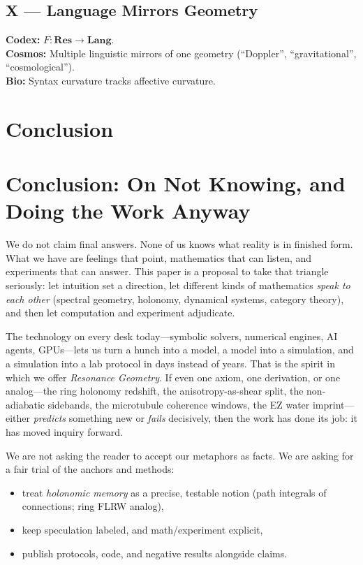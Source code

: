 \documentclass[11pt]{article}
\begin{document}
\subsection*{X --- Language Mirrors Geometry}
\textbf{Codex:} $F:\mathbf{Res}\to \mathbf{Lang}$. \\
\textbf{Cosmos:} Multiple linguistic mirrors of one geometry (``Doppler'', ``gravitational'', ``cosmological''). \\
\textbf{Bio:} Syntax curvature tracks affective curvature.

\section{Conclusion}
\section{Conclusion: On Not Knowing, and Doing the Work Anyway}

We do not claim final answers. None of us knows what reality is in finished form.
What we have are feelings that point, mathematics that can listen, and experiments that can answer.
This paper is a proposal to take that triangle seriously: let intuition set a direction,
let different kinds of mathematics \emph{speak to each other} (spectral geometry, holonomy, dynamical systems, category theory),
and then let computation and experiment adjudicate.

The technology on every desk today---symbolic solvers, numerical engines, AI agents, GPUs---lets us turn
a hunch into a model, a model into a simulation, and a simulation into a lab protocol in days instead of years.
That is the spirit in which we offer \emph{Resonance Geometry}.
If even one axiom, one derivation, or one analog---the ring holonomy redshift, the anisotropy-as-shear split,
the non-adiabatic sidebands, the microtubule coherence windows, the EZ water imprint---either
\emph{predicts} something new or \emph{fails} decisively, then the work has done its job:
it has moved inquiry forward.

We are not asking the reader to accept our metaphors as facts.
We are asking for a fair trial of the anchors and methods:
\begin{itemize}
  \item treat \emph{holonomic memory} as a precise, testable notion (path integrals of connections; ring FLRW analog),
  \item keep speculation labeled, and math/experiment explicit,
  \item publish protocols, code, and negative results alongside claims.
\end{itemize}
\end{document}
